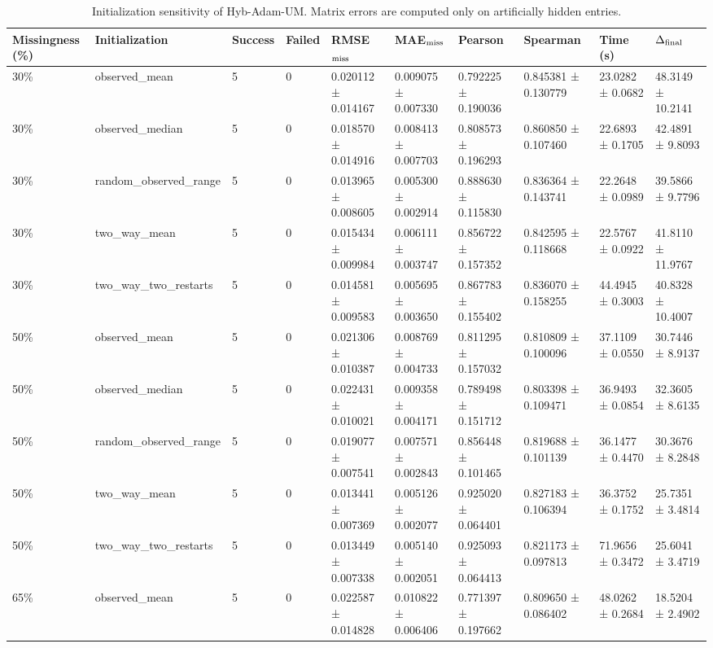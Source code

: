 \begin{table}[t]
\centering
\caption{Initialization sensitivity of Hyb-Adam-UM. Matrix errors are computed only on artificially hidden entries.}
\label{tab:hyb_initialization_sensitivity}
\small
\setlength{\tabcolsep}{3pt}
\begin{tabular}{llllllllll}
\toprule
Missingness (\%) & Initialization & Success & Failed & RMSE$_{\rm miss}$ & MAE$_{\rm miss}$ & Pearson & Spearman & Time (s) & $\Delta_{\rm final}$ \\
\midrule
30\% & observed\_mean & 5 & 0 & 0.020112 ± 0.014167 & 0.009075 ± 0.007330 & 0.792225 ± 0.190036 & 0.845381 ± 0.130779 & 23.0282 ± 0.0682 & 48.3149 ± 10.2141 \\
30\% & observed\_median & 5 & 0 & 0.018570 ± 0.014916 & 0.008413 ± 0.007703 & 0.808573 ± 0.196293 & 0.860850 ± 0.107460 & 22.6893 ± 0.1705 & 42.4891 ± 9.8093 \\
30\% & random\_observed\_range & 5 & 0 & 0.013965 ± 0.008605 & 0.005300 ± 0.002914 & 0.888630 ± 0.115830 & 0.836364 ± 0.143741 & 22.2648 ± 0.0989 & 39.5866 ± 9.7796 \\
30\% & two\_way\_mean & 5 & 0 & 0.015434 ± 0.009984 & 0.006111 ± 0.003747 & 0.856722 ± 0.157352 & 0.842595 ± 0.118668 & 22.5767 ± 0.0922 & 41.8110 ± 11.9767 \\
30\% & two\_way\_two\_restarts & 5 & 0 & 0.014581 ± 0.009583 & 0.005695 ± 0.003650 & 0.867783 ± 0.155402 & 0.836070 ± 0.158255 & 44.4945 ± 0.3003 & 40.8328 ± 10.4007 \\
50\% & observed\_mean & 5 & 0 & 0.021306 ± 0.010387 & 0.008769 ± 0.004733 & 0.811295 ± 0.157032 & 0.810809 ± 0.100096 & 37.1109 ± 0.0550 & 30.7446 ± 8.9137 \\
50\% & observed\_median & 5 & 0 & 0.022431 ± 0.010021 & 0.009358 ± 0.004171 & 0.789498 ± 0.151712 & 0.803398 ± 0.109471 & 36.9493 ± 0.0854 & 32.3605 ± 8.6135 \\
50\% & random\_observed\_range & 5 & 0 & 0.019077 ± 0.007541 & 0.007571 ± 0.002843 & 0.856448 ± 0.101465 & 0.819688 ± 0.101139 & 36.1477 ± 0.4470 & 30.3676 ± 8.2848 \\
50\% & two\_way\_mean & 5 & 0 & 0.013441 ± 0.007369 & 0.005126 ± 0.002077 & 0.925020 ± 0.064401 & 0.827183 ± 0.106394 & 36.3752 ± 0.1752 & 25.7351 ± 3.4814 \\
50\% & two\_way\_two\_restarts & 5 & 0 & 0.013449 ± 0.007338 & 0.005140 ± 0.002051 & 0.925093 ± 0.064413 & 0.821173 ± 0.097813 & 71.9656 ± 0.3472 & 25.6041 ± 3.4719 \\
65\% & observed\_mean & 5 & 0 & 0.022587 ± 0.014828 & 0.010822 ± 0.006406 & 0.771397 ± 0.197662 & 0.809650 ± 0.086402 & 48.0262 ± 0.2684 & 18.5204 ± 2.4902 \\

\end{tabular}
\end{table}
